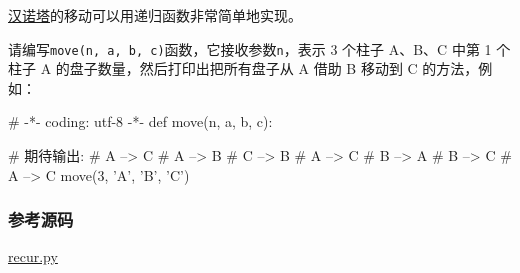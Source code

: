 \href{http://baike.baidu.com/view/191666.htm}{汉诺塔}的移动可以用递归函数非常简单地实现。

请编写\texttt{move(n,\ a,\ b,\ c)}函数，它接收参数\texttt{n}，表示 3
个柱子 A、B、C 中第 1 个柱子 A 的盘子数量，然后打印出把所有盘子从 A 借助
B 移动到 C 的方法，例如：

\begin{pythoncode}
# -*- coding: utf-8 -*-
def move(n, a, b, c):
\end{pythoncode}

\begin{pythoncode}
# 期待输出:
# A --> C
# A --> B
# C --> B
# A --> C
# B --> A
# B --> C
# A --> C
move(3, 'A', 'B', 'C')
\end{pythoncode}

\hypertarget{ux53c2ux8003ux6e90ux7801}{%
\subsubsection{参考源码}\label{ux53c2ux8003ux6e90ux7801}}

\href{https://github.com/michaelliao/learn-python3/blob/master/samples/function/recur.py}{recur.py}

